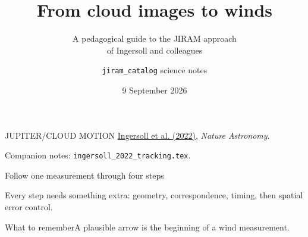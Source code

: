 \documentclass[aspectratio=169,11pt]{beamer}
\title{From cloud images to winds}
\subtitle{A pedagogical guide to the JIRAM approach\\of Ingersoll and colleagues}
\author{\texttt{jiram\_catalog} science notes}
\date{9 September 2026}
\newcommand{\prov}{}
\newcommand{\evidence}[1]{\gdef\prov{#1}}
\newcommand{\takeaway}[1]{\vspace{0.3em}\begin{block}{What to remember}#1\end{block}}
\newcommand{\paperlink}{\href{https://doi.org/10.1038/s41550-022-01774-0}{Ingersoll et al. (2022)}}
\begin{document}
\evidence{Reading guide: reported method, original teaching examples, repository evidence, proposed features.}
\begin{frame}[plain]
 \vspace{0.6cm}
 {\color{teal}\large JUPITER\quad/\quad CLOUD MOTION}
 \vspace{0.45cm}
 \titlepage
 \vspace{-0.5cm}
 \small\paperlink{}, \emph{Nature Astronomy}.
 \par\small Companion notes: \texttt{ingersoll\_2022\_tracking.tex}.
\end{frame}

\evidence{Original teaching framework. Detailed notes contain derivations and source locators.}
\begin{frame}{Follow one measurement through four steps}
 \begin{center}
 \end{center}
 \vspace{0.6cm}
 Every step needs something extra: geometry, correspondence, timing, then
 spatial error control.
 \takeaway{A plausible arrow is the beginning of a wind measurement.}
\end{frame}
\end{document}
